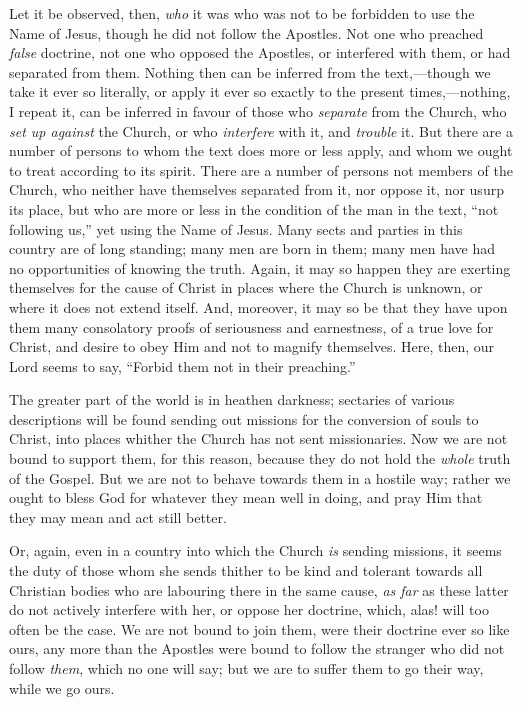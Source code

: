 Let it be observed, then, \emph{who} it was who was not to be
forbidden to use the Name of Jesus, though he did not follow the
Apostles. Not one who preached \emph{false} doctrine, not one who
opposed the Apostles, or interfered with them, or had separated from
them. Nothing then can be inferred from the text,—though we take it
ever so literally, or apply it ever so exactly to the present times,—nothing,
I repeat it, can be inferred in favour of those who \emph{separate}
from the Church, who \emph{set up against} the Church, or who \emph{interfere}
with it, and \emph{trouble} it. But there are a number of persons to
whom the text does more or less apply, and whom we ought to treat
according to its spirit. There are a number of persons not members of
the Church, who neither have themselves separated from it, nor oppose
it, nor usurp its place, but who are more or less in the condition of
the man in the text, ``not following us,'' yet using the Name
of Jesus. Many sects and parties in this country are of long standing;
many men are born in them; many men have had no opportunities of
knowing the truth. Again, it may so happen they are exerting
themselves for the cause of Christ in places where the Church is
unknown, or where it does not extend itself. And, moreover, it may so
be that they have upon them many consolatory proofs of seriousness and
earnestness, of a true love for Christ, and desire to obey Him and not
to magnify themselves. Here, then, our Lord seems to say, ``Forbid
them not in their preaching.''

The greater part of the world is in heathen darkness; sectaries of
various descriptions will be found sending out missions for the
conversion of souls to Christ, into places whither the Church has not
sent missionaries. Now we are not bound to support them, for this
reason, because they do not hold the \emph{whole} truth of the Gospel.
But we are not to behave towards them in a hostile way; rather we
ought to bless God for whatever they mean well in doing, and pray Him
that they may mean and act still better.

Or, again, even in a country into which the Church \emph{is}
sending missions, it seems the duty of those whom she sends thither to
be kind and tolerant towards all Christian bodies who are labouring
there in the same cause, \emph{as far} as these latter do not actively
interfere with her, or oppose her doctrine, which, alas! will too
often be the case. We are not bound to join them, were their doctrine
ever so like ours, any more than the Apostles were bound to follow the
stranger who did not follow \emph{them}, which no one will say; but we
are to suffer them to go their way, while we go ours.

